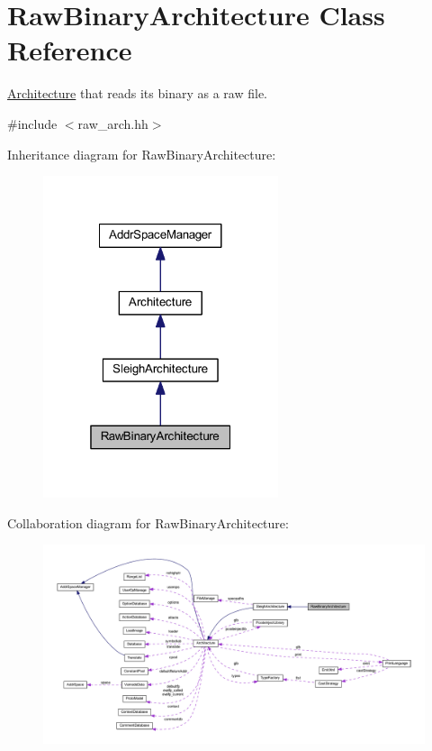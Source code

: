 \hypertarget{class_raw_binary_architecture}{}\section{Raw\+Binary\+Architecture Class Reference}
\label{class_raw_binary_architecture}


\mbox{\hyperlink{class_architecture}{Architecture}} that reads its binary as a raw file.  




{\ttfamily \#include $<$raw\+\_\+arch.\+hh$>$}



Inheritance diagram for Raw\+Binary\+Architecture\+:
\nopagebreak
\begin{figure}[H]
\begin{center}
\leavevmode
\includegraphics[width=196pt]{class_raw_binary_architecture__inherit__graph}
\end{center}
\end{figure}


Collaboration diagram for Raw\+Binary\+Architecture\+:
\nopagebreak
\begin{figure}[H]
\begin{center}
\leavevmode
\includegraphics[width=350pt]{class_raw_binary_architecture__coll__graph}
\end{center}
\end{figure}
